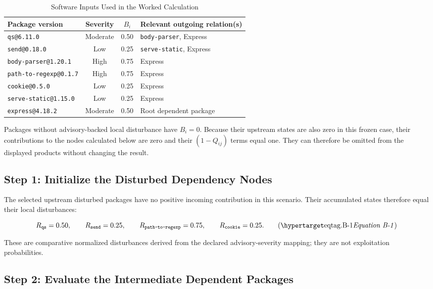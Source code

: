\begin{table}[H]
\caption{Software Inputs Used in the Worked Calculation}
\label{tab:app-software-inputs}
\centering
\small
\begin{tabularx}{\textwidth}{@{}L c c L@{}}
\toprule
Package version & Severity & \(B_i\) & Relevant outgoing relation(s) \\
\midrule
\texttt{qs@6.11.0} & Moderate & 0.50 & \texttt{body-parser}, Express \\
\texttt{send@0.18.0} & Low & 0.25 & \texttt{serve-static}, Express \\
\texttt{body-parser@1.20.1} & High & 0.75 & Express \\
\texttt{path-to-regexp@0.1.7} & High & 0.75 & Express \\
\texttt{cookie@0.5.0} & Low & 0.25 & Express \\
\texttt{serve-static@1.15.0} & Low & 0.25 & Express \\
\texttt{express@4.18.2} & Moderate & 0.50 & Root dependent package \\
\bottomrule
\end{tabularx}
\end{table}

Packages without advisory-backed local disturbance have \(B_i=0\). Because
their upstream states are also zero in this frozen case, their contributions
to the nodes calculated below are zero and their \((1-Q_{ij})\) terms equal
one. They can therefore be omitted from the displayed products without
changing the result.

\subsection{Step 1: Initialize the Disturbed Dependency Nodes}

The selected upstream disturbed packages have no positive incoming
contribution in this scenario. Their accumulated states therefore equal their
local disturbances:

\[
R_{\texttt{qs}}=0.50,
\qquad
R_{\texttt{send}}=0.25,
\qquad
R_{\texttt{path-to-regexp}}=0.75,
\qquad
R_{\texttt{cookie}}=0.25.
\eqtag{B-1}
\]

These are comparative normalized disturbances derived from the declared
advisory-severity mapping; they are not exploitation probabilities.

\subsection{Step 2: Evaluate the Intermediate Dependent Packages}

